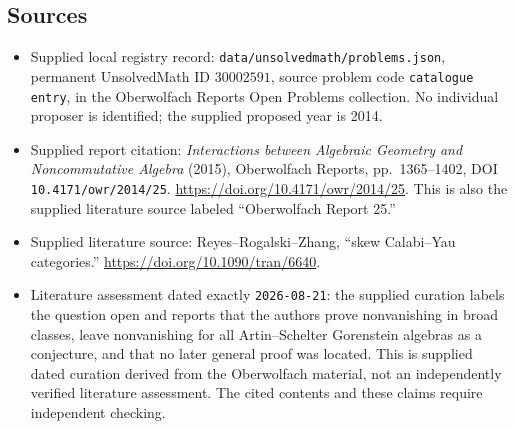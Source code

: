 \documentclass[11pt]{article}
\begin{document}
\subsection{Sources}
\begin{itemize}
\item Supplied local registry record: \texttt{data/unsolvedmath/problems.json}, permanent UnsolvedMath ID \(30002591\), source problem code \texttt{catalogue entry}, in the Oberwolfach Reports Open Problems collection. No individual proposer is identified; the supplied proposed year is 2014.
\item Supplied report citation: \emph{Interactions between Algebraic Geometry and Noncommutative Algebra} (2015), Oberwolfach Reports, pp.~1365--1402, DOI \texttt{10.4171/owr/2014/25}. \url{https://doi.org/10.4171/owr/2014/25}. This is also the supplied literature source labeled ``Oberwolfach Report 25.''
\item Supplied literature source: Reyes--Rogalski--Zhang, ``skew Calabi--Yau categories.'' \url{https://doi.org/10.1090/tran/6640}.
\item Literature assessment dated exactly \texttt{2026-08-21}: the supplied curation labels the question open and reports that the authors prove nonvanishing in broad classes, leave nonvanishing for all Artin--Schelter Gorenstein algebras as a conjecture, and that no later general proof was located. This is supplied dated curation derived from the Oberwolfach material, not an independently verified literature assessment. The cited contents and these claims require independent checking.
\end{itemize}
\end{document}
